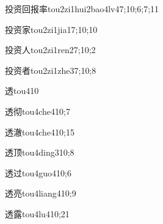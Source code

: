 \begin{verbete}{投资回报率}{tou2zi1hui2bao4lv4}{7;10;6;7;11}
\end{verbete}

\begin{verbete}{投资家}{tou2zi1jia1}{7;10;10}
\end{verbete}

\begin{verbete}{投资人}{tou2zi1ren2}{7;10;2}
\end{verbete}

\begin{verbete}{投资者}{tou2zi1zhe3}{7;10;8}
\end{verbete}

\begin{verbete}{透}{tou4}{10}
\end{verbete}

\begin{verbete}{透彻}{tou4che4}{10;7}
\end{verbete}

\begin{verbete}{透澈}{tou4che4}{10;15}
\end{verbete}

\begin{verbete}{透顶}{tou4ding3}{10;8}
\end{verbete}

\begin{verbete}{透过}{tou4guo4}{10;6}
\end{verbete}

\begin{verbete}{透亮}{tou4liang4}{10;9}
\end{verbete}

\begin{verbete}{透露}{tou4lu4}{10;21}
\end{verbete}

